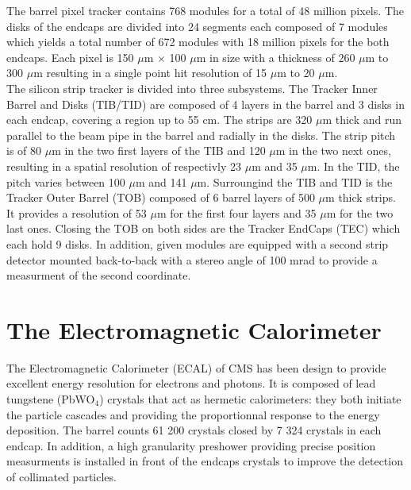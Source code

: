     The barrel pixel tracker contains 768 modules for a total of 48 million pixels. The disks of the endcaps are divided into 24 segments each composed of 7 modules which yields a total number of 672 modules with 18 million pixels for the both endcaps. Each pixel is 150 $\mu$m $\times$ 100 $\mu$m in size with a thickness of 260 $\mu$m to 300 $\mu$m resulting in a single point hit resolution of 15 $\mu$m to 20 $\mu$m. \\

    The silicon strip tracker is divided into three subsystems. The Tracker Inner Barrel and Disks (TIB/TID) are composed of 4 layers in the barrel and 3 disks in each endcap, covering a region up to 55 cm. The strips are 320 $\mu$m thick and run parallel to the beam pipe in the barrel and radially in the disks. The strip pitch is of 80 $\mu$m in the two first layers of the TIB and 120 $\mu$m in the two next ones, resulting in a spatial resolution of respectivly 23 $\mu$m and 35 $\mu$m. In the TID, the pitch varies between 100 $\mu$m and 141 $\mu$m. Surroungind the TIB and TID is the Tracker Outer Barrel (TOB) composed of 6 barrel layers of 500 $\mu$m thick strips. It provides a resolution of 53 $\mu$m for the first four layers and 35 $\mu$m for the two last ones. Closing the TOB on both sides are the Tracker EndCaps (TEC) which each hold 9 disks. In addition, given modules are equipped with a second strip detector mounted back-to-back with a stereo angle of 100 mrad to provide a measurment of the second coordinate.

  \section{The Electromagnetic Calorimeter}

    The Electromagnetic Calorimeter (ECAL) of CMS has been design to provide excellent energy resolution for electrons and photons. It is composed of lead tungstene (PbWO$_4$) crystals that act as hermetic calorimeters: they both initiate the particle cascades and providing the proportionnal response to the energy deposition. The barrel counts 61 200 crystals closed by 7 324 crystals in each endcap. In addition, a high granularity preshower providing precise position measurments is installed in front of the endcaps crystals to improve the detection of collimated particles. \\

